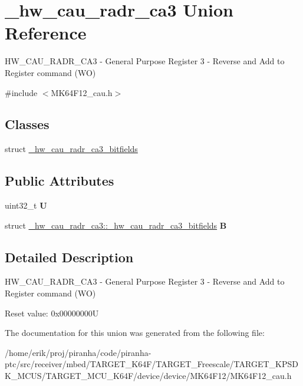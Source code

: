 \hypertarget{union__hw__cau__radr__ca3}{}\section{\+\_\+hw\+\_\+cau\+\_\+radr\+\_\+ca3 Union Reference}
\label{union__hw__cau__radr__ca3}


H\+W\+\_\+\+C\+A\+U\+\_\+\+R\+A\+D\+R\+\_\+\+C\+A3 -\/ General Purpose Register 3 -\/ Reverse and Add to Register command (WO)  




{\ttfamily \#include $<$M\+K64\+F12\+\_\+cau.\+h$>$}

\subsection*{Classes}
\begin{DoxyCompactItemize}
\item 
struct \hyperlink{struct__hw__cau__radr__ca3_1_1__hw__cau__radr__ca3__bitfields}{\+\_\+hw\+\_\+cau\+\_\+radr\+\_\+ca3\+\_\+bitfields}
\end{DoxyCompactItemize}
\subsection*{Public Attributes}
\begin{DoxyCompactItemize}
\item 
uint32\+\_\+t {\bfseries U}\hypertarget{union__hw__cau__radr__ca3_af1c025f4f3caf5be187482cf04e479f0}{}\label{union__hw__cau__radr__ca3_af1c025f4f3caf5be187482cf04e479f0}

\item 
struct \hyperlink{struct__hw__cau__radr__ca3_1_1__hw__cau__radr__ca3__bitfields}{\+\_\+hw\+\_\+cau\+\_\+radr\+\_\+ca3\+::\+\_\+hw\+\_\+cau\+\_\+radr\+\_\+ca3\+\_\+bitfields} {\bfseries B}\hypertarget{union__hw__cau__radr__ca3_a4d492d1da4e1a616819f6495ee49bdc7}{}\label{union__hw__cau__radr__ca3_a4d492d1da4e1a616819f6495ee49bdc7}

\end{DoxyCompactItemize}


\subsection{Detailed Description}
H\+W\+\_\+\+C\+A\+U\+\_\+\+R\+A\+D\+R\+\_\+\+C\+A3 -\/ General Purpose Register 3 -\/ Reverse and Add to Register command (WO) 

Reset value\+: 0x00000000U 

The documentation for this union was generated from the following file\+:\begin{DoxyCompactItemize}
\item 
/home/erik/proj/piranha/code/piranha-\/ptc/src/receiver/mbed/\+T\+A\+R\+G\+E\+T\+\_\+\+K64\+F/\+T\+A\+R\+G\+E\+T\+\_\+\+Freescale/\+T\+A\+R\+G\+E\+T\+\_\+\+K\+P\+S\+D\+K\+\_\+\+M\+C\+U\+S/\+T\+A\+R\+G\+E\+T\+\_\+\+M\+C\+U\+\_\+\+K64\+F/device/device/\+M\+K64\+F12/M\+K64\+F12\+\_\+cau.\+h\end{DoxyCompactItemize}

